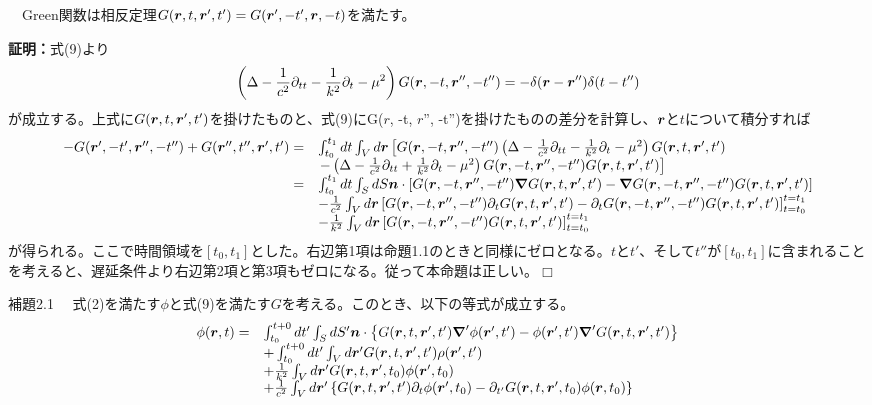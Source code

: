\documentclass[dvipdfmx, 9pt, a4paper]{jsarticle}
\newcommand{\bm}[1]{{\mbox{\boldmath $#1$}}}
\newcommand{\bnabla}{\bm \nabla}
\def\qed{\hfill $\Box$}
\begin{document}
\begin{tcolorbox}[title=命題2.1：相反定理]
　Green関数は相反定理$G(\bm r, t, \bm r', t')=G(\bm r', -t', \bm r, -t)$を満たす。
\end{tcolorbox}
{\bf 証明：}式(9)より
\begin{equation}
\left(\Delta -\frac{1}{c^2}\partial_{tt}-\frac{1}{k^2}\partial_t-\mu^2 \right)G(\bm r, -t, \bm r'', -t'')=-\delta(\bm r-\bm r'')\delta(t-t'') \notag
\end{equation}
が成立する。上式に$G(\bm r, t, \bm r', t')$を掛けたものと、式(9)にG(\bm r, -t, \bm r'', -t'')を掛けたものの差分を計算し、$\bm r$と$t$について積分すれば
\begin{equation}
\begin{array}{rl}
-G(\bm r', -t', \bm r'', -t'')+G(\bm r'', t'', \bm r', t')=&\int_{t_0}^{t_1}dt \int_Vd \bm r \left[G(\bm r, -t, \bm r'', -t'')\left(\Delta -\frac{1}{c^2}\partial_{tt}-\frac{1}{k^2}\partial_t-\mu^2 \right)G(\bm r, t, \bm r', t') \right. \\
 &\left. -\left(\Delta -\frac{1}{c^2}\partial_{tt}+\frac{1}{k^2}\partial_t-\mu^2 \right)G(\bm r, -t, \bm r'', -t'')G(\bm r, t, \bm r', t') \right] \\ 
=&\int_{t_0}^{t_1}dt\int_S dS\bm n \cdot \left[ G(\bm r, -t, \bm r'', -t'')\bnabla G(\bm r, t, \bm r', t')-\bnabla G(\bm r, -t, \bm r'', -t'')G(\bm r, t, \bm r', t') \right] \\
 &-\frac{1}{c^2}\int_V d\bm r\left[ G(\bm r, -t,\bm r'', -t'')\partial_tG(\bm r, t, \bm r', t')-\partial_tG(\bm r, -t, \bm r'', -t'')G(\bm r, t, \bm r', t')\right]_{t=t_0}^{t=t_1} \\
 & -\frac{1}{k^2}\int_V d\bm r\left[ G(\bm r, -t, \bm r'', -t'')G(\bm r, t, \bm r', t') \right]_{t=t_0}^{t=t_1}
\end{array} \notag
\end{equation}
が得られる。ここで時間領域を$[t_0, t_1]$とした。右辺第1項は命題1.1のときと同様にゼロとなる。$t$と$t'$、そして$t''$が$[t_0, t_1]$に含まれることを考えると、遅延条件より右辺第2項と第3項もゼロになる。従って本命題は正しい。\qed
\begin{itembox}[l]{補題2.1}
　式(2)を満たす$\phi$と式(9)を満たす$G$を考える。このとき、以下の等式が成立する。
\begin{equation}
\begin{array}{ll}
\phi(\bm r, t)=&\int_{t_0}^{t+0}dt' \int_SdS'\bm n \cdot \left\{ G(\bm r, t, \bm r', t')\bnabla' \phi(\bm r', t')-\phi(\bm r', t')\bnabla'G(\bm r, t, \bm r', t') \right\} \\
 &+\int_{t_0}^{t+0}dt'\int_V d\bm r'G(\bm r, t, \bm r', t')\rho(\bm r', t') \\
 &+\frac{1}{k^2}\int_V d\bm r'G(\bm r, t, \bm r', t_0)\phi(\bm r', t_0) \\
 &+\frac{1}{c^2}\int_V d\bm r'\left\{ G(\bm r, t, \bm r', t')\partial_t\phi(\bm r', t_0)-\partial_{t'}G(\bm r, t, \bm r', t_0)\phi(\bm r, t_0) \right\}
\end{array} \notag
\end{equation}
\end{itembox}\par
\end{document}
